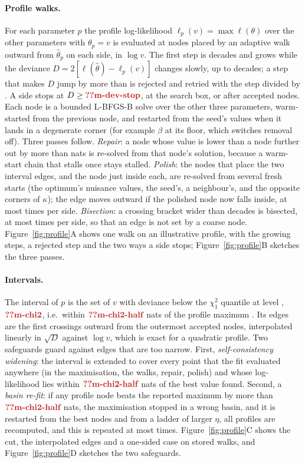 \paragraph{Profile walks.} For each parameter $p$ the profile log-likelihood $\ell_p(v)=\max\ell(\theta)$ over the other
parameters with $\theta_p=v$ is evaluated at nodes placed by an adaptive walk outward from $\hat\theta_p$ on each side, in
$\log v$. The first step is  decades and grows while the deviance $D=2[\ell(\hat\theta)-\ell_p(v)]$ changes slowly, up to
 decades; a step that makes $D$ jump by more than  is rejected and retried with the step divided by . A side
stops at $D\ge\C{m-dev-stop}$, at the search box, or after  accepted nodes. Each node is a bounded L-BFGS-B solve over the other three
parameters, warm-started from the previous node, and restarted from the seed's values when it lands in a degenerate corner (for
example $\beta$ at its floor, which switches removal off). Three passes follow. \emph{Repair}: a node whose value is lower than
a node further out by more than  nats is re-solved from that node's solution, because a warm-start chain that stalls
once stays stalled. \emph{Polish}: the nodes that place the two interval edges, and the node just inside each, are re-solved from several
fresh starts (the optimum's nuisance values, the seed's, a neighbour's, and the opposite corners of $\kappa$); the edge moves
outward if the polished node now falls inside, at most  times per side. \emph{Bisection}: a crossing bracket wider than
 decades is bisected, at most  times per side, so that an edge is not set by a coarse node.
Figure~\ref{fig:profile}A shows one walk on an illustrative profile, with the growing steps, a rejected step and the two
ways a side stops; Figure~\ref{fig:profile}B sketches the three passes.

\paragraph{Intervals.} The interval of $p$ is the set of $v$ with deviance below the $\chi^2_1$ quantile at level
, $\C{m-chi2}$, i.e.\ within $\C{m-chi2-half}$ nats of the profile maximum \citep{venzon1988method,raue2009structural}. Its edges are the
first crossings outward from the outermost accepted nodes, interpolated linearly in $\sqrt D$ against $\log v$, which is exact for a
quadratic profile. Two safeguards guard against edges that are too narrow. First, \emph{self-consistency widening}: the
interval is extended to cover every point that the fit evaluated anywhere (in the maximisation, the walks, repair, polish) and
whose log-likelihood lies within $\C{m-chi2-half}$ nats of the best value found. Second, a \emph{basin re-fit}: if any profile node beats the
reported maximum by more than $\C{m-chi2-half}$ nats, the maximisation stopped in a wrong basin, and it is restarted from the best nodes and from a
ladder of larger $\eta$, all profiles are recomputed, and this is repeated at most  times.
Figure~\ref{fig:profile}C shows the cut, the interpolated edges and a one-sided case on stored walks, and
Figure~\ref{fig:profile}D sketches the two safeguards.

